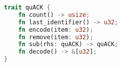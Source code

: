 \begin{lstfloat}[t]
\begin{lstlisting}[language=Rust]
trait quACK {
    fn count() -> usize;
    fn last_identifier() -> u32;
    fn encode(item: u32);
    fn remove(item: u32);
    fn sub(rhs: quACK) -> quACK;
    fn decode() -> &[u32];
}
\end{lstlisting}
\label{lst:quack-interface}
\end{lstfloat}
